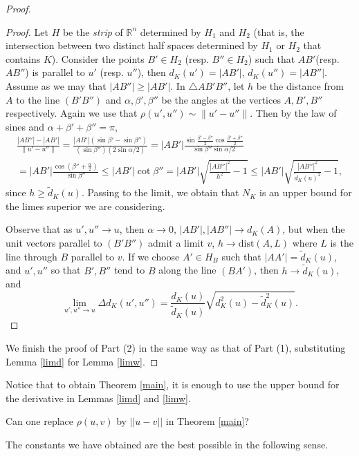 \documentclass[a4paper,12pt]{amsart}
\begin{document}
\begin{proof}
\begin{proof}
Let $H$ be the \emph{strip} of $\mathbb R^n$ determined by $H_1$
and $H_2$ (that is, the intersection between two distinct half
spaces determined by $H_1$ or $H_2$ that contains $K$). Consider
the points $B' \in H_2$ (resp. $B''\in H_2$) such that $AB'$(resp.
$AB''$) is parallel to $u'$ (resp. $u''$), then $d_K(u')=|AB'|$,
$d_K(u'')=|AB''|$. Assume as we may that $|AB''|\ge |AB'|$. In
$\triangle AB'B''$, let $h$ be the distance from $A$ to the line
$(B'B'')$ and  $\alpha, \beta', \beta''$ be the angles at the
vertices $A, B', B''$ respectively. Again we use that
$\rho(u',u'') \sim \|u'-u''\|$. Then by the law of sines and
$\alpha+ \beta'+ \beta''=\pi$,
\begin{multline*}
\frac{|AB''|- |AB'|}{\|u'-u''\|} = \frac{|AB'|(\sin \beta' - \sin \beta'')}
{ (\sin \beta'')( 2 \sin \alpha/2) } = |AB'| \frac{\sin \frac{\beta'-\beta''}
2  \cos \frac{\beta'+\beta''}2}{ \sin \beta''  \sin \alpha/2 }
\\
= |AB'| \frac{\cos (\beta''+  \frac{\alpha}2)}{ \sin \beta'' } \le |AB'| \cot \beta'' =
|AB'| \sqrt{\frac{|AB''|^2}{h^2} -1 } \le  |AB'| \sqrt{\frac{|AB''|^2}{\tilde d_K(u)^2} -1 },
\end{multline*}
since $h\ge \tilde d_K(u)$. Passing to the limit, we obtain that $N_K$
is an upper bound for the limes superior we are considering.

Observe that as $u', u''\to u$, then $\alpha \to 0$, $|AB'|,|AB''|\to d_K(A)$,
but when the unit vectors parallel to $(B'B'')$ admit a limit $v$,
$h\to \mbox{dist}(A, L)$
where $L$ is the line through $B$ parallel to $v$.
If we choose $A' \in H_B$ such that $|AA'|= \tilde d_K(u)$, and $u',u''$
so that $B', B''$ tend to $B$ along the line $(BA')$, then
$h\to  \tilde d_K(u)$, and $$\lim_{u',u''\to u}\Delta d_K(u',u'')=
\frac{d_K(u)}{\tilde d_K(u)}\sqrt{d^2_K(u)-\tilde d^2_K(u)}.$$
\end{proof}

We finish the proof of Part (2) in the same way as that of Part
(1), substituting Lemma \ref{limd} for Lemma \ref{limw}.
\end{proof}

 Notice that to obtain Theorem \ref{main}, it is enough to
use the upper bound for the derivative in Lemmas \ref{limd} and \ref{limw}.
\smallskip

 Can one replace $\rho(u,v)$ by $||u-
v||$ in Theorem \ref{main}?
\smallskip

The constants we have obtained are the
best possible in the following sense.
\end{document}
